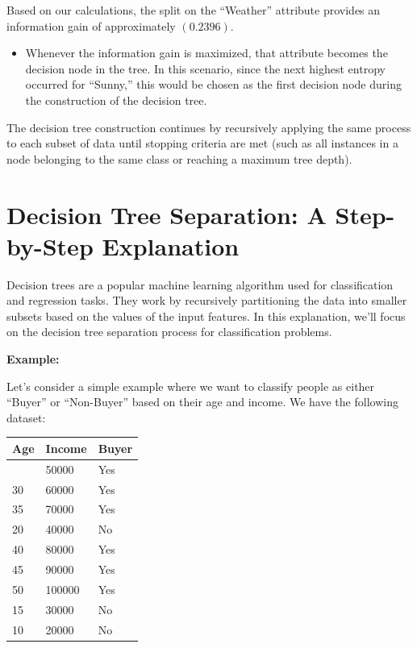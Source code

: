 \documentclass[12pt]{book}
\providecommand{\tightlist}{%
  \setlength{\itemsep}{0pt}\setlength{\parskip}{0pt}}
\begin{document}
Based on our calculations, the split on the ``Weather'' attribute
provides an information gain of approximately \((0.2396)\).

\begin{itemize}
\tightlist
\item
  Whenever the information gain is maximized, that attribute becomes the
  decision node in the tree. In this scenario, since the next highest
  entropy occurred for ``Sunny,'' this would be chosen as the first
  decision node during the construction of the decision tree.
\end{itemize}

The decision tree construction continues by recursively applying the
same process to each subset of data until stopping criteria are met
(such as all instances in a node belonging to the same class or reaching
a maximum tree depth).

\section{\texorpdfstring{\textbf{Decision Tree Separation: A
Step-by-Step
Explanation}}{Decision Tree Separation: A Step-by-Step Explanation}}\label{decision-tree-separation-a-step-by-step-explanation}

Decision trees are a popular machine learning algorithm used for
classification and regression tasks. They work by recursively
partitioning the data into smaller subsets based on the values of the
input features. In this explanation, we'll focus on the decision tree
separation process for classification problems.

\textbf{Example:}

Let's consider a simple example where we want to classify people as
either ``Buyer'' or ``Non-Buyer'' based on their age and income. We have
the following dataset:

\begin{longtable}[]{@{}lll@{}}
\toprule\noalign{}
Age & Income & Buyer \\
\midrule\noalign{}
\endhead
\bottomrule\noalign{}
\endlastfoot
25 & 50000 & Yes \\
30 & 60000 & Yes \\
35 & 70000 & Yes \\
20 & 40000 & No \\
40 & 80000 & Yes \\
45 & 90000 & Yes \\
50 & 100000 & Yes \\
15 & 30000 & No \\
10 & 20000 & No \\
\end{longtable}
\end{document}
